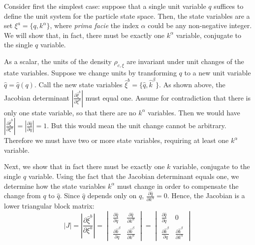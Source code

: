 \documentclass[12pt, english, twoside]{article} %
\begin{document}
Consider first the simplest case: suppose that a single unit variable $q $ suffices to define the unit system for the particle state space. Then, the state variables are a set $\xi^a = \{ q, k^\alpha \}$, where \textit{prima facie} the index $\alpha$ could be any non-negative integer. We will show that, in fact, there must be exactly one $k^\alpha$ variable, conjugate to the single $q$ variable. 

As a scalar, the units of the density $\rho_{c, \xi}$ are invariant under unit changes of the state variables. Suppose we change units by transforming $q$ to a new unit variable $\hat{q}=\hat{q}(q)$. Call the new state variables $\hat{\xi}^b = \{ \hat{q}, \hat{k}^\beta\}$. As shown above, the Jacobian determinant $\left|\frac{\partial \hat{\xi}^b}{\partial \xi^a} \right|$ must equal one. Assume for contradiction that there is only one state variable, so that there are no $k^\alpha$ variables. Then we would have $\left|\frac{\partial \hat{\xi}^b}{\partial \xi^a} \right| = \left|\frac{\partial \hat q}{\partial q} \right| = 1$. But this would mean the unit change cannot be arbitrary. Therefore we must have two or more state variables, requiring at least one $k^\alpha$ variable. 

Next, we show that in fact there must be exactly one $k$ variable, conjugate to the single $q$ variable. Using the fact that the Jacobian determinant equals one, we determine how the state variables $k^\alpha$ must change in order to compensate the change from $q$ to $\hat q$. Since $\hat{q}$ depends only on $q$, $\frac{\partial \hat{q}}{\partial k^\alpha} = 0$. Hence, the Jacobian is a lower triangular block matrix: 
\begin{equation}
|J| = \left|\frac{\partial \hat{\xi}^b}{\partial \xi^a} \right| = \begin{vmatrix}
\frac{\partial \hat{q}}{\partial q} & \frac{\partial \hat{q}}{\partial k^\alpha} \\
\frac{\partial \hat{k}^\beta}{\partial q} & \frac{\partial \hat{k}^\beta}{\partial  k^\alpha} 
\end{vmatrix} = \begin{vmatrix}
\frac{\partial \hat{q}}{\partial q} & 0 \\
\frac{\partial \hat{k}^\beta}{\partial q} & \frac{\partial \hat{k}^\beta}{\partial  k^\alpha}
\end{vmatrix}
\end{equation}
\end{document}
